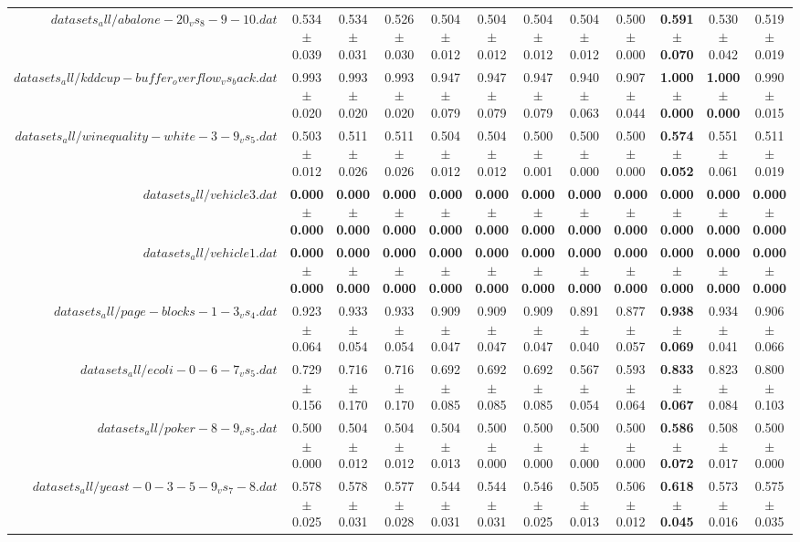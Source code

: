 \begin{table}[!ht]
{\begin{tabular}{r c c c c c c c c c c c}
$datasets_all/abalone-20_vs_8-9-10.dat$ & 0.534 $\pm$ 0.039 & 0.534 $\pm$ 0.031 & 0.526 $\pm$ 0.030 & 0.504 $\pm$ 0.012 & 0.504 $\pm$ 0.012 & 0.504 $\pm$ 0.012 & 0.504 $\pm$ 0.012 & 0.500 $\pm$ 0.000 & \textbf{0.591 $\pm$ 0.070} & 0.530 $\pm$ 0.042 & 0.519 $\pm$ 0.019 \\
$datasets_all/kddcup-buffer_overflow_vs_back.dat$ & 0.993 $\pm$ 0.020 & 0.993 $\pm$ 0.020 & 0.993 $\pm$ 0.020 & 0.947 $\pm$ 0.079 & 0.947 $\pm$ 0.079 & 0.947 $\pm$ 0.079 & 0.940 $\pm$ 0.063 & 0.907 $\pm$ 0.044 & \textbf{1.000 $\pm$ 0.000} & \textbf{1.000 $\pm$ 0.000} & 0.990 $\pm$ 0.015 \\
$datasets_all/winequality-white-3-9_vs_5.dat$ & 0.503 $\pm$ 0.012 & 0.511 $\pm$ 0.026 & 0.511 $\pm$ 0.026 & 0.504 $\pm$ 0.012 & 0.504 $\pm$ 0.012 & 0.500 $\pm$ 0.001 & 0.500 $\pm$ 0.000 & 0.500 $\pm$ 0.000 & \textbf{0.574 $\pm$ 0.052} & 0.551 $\pm$ 0.061 & 0.511 $\pm$ 0.019 \\
$datasets_all/vehicle3.dat$ & \textbf{0.000 $\pm$ 0.000} & \textbf{0.000 $\pm$ 0.000} & \textbf{0.000 $\pm$ 0.000} & \textbf{0.000 $\pm$ 0.000} & \textbf{0.000 $\pm$ 0.000} & \textbf{0.000 $\pm$ 0.000} & \textbf{0.000 $\pm$ 0.000} & \textbf{0.000 $\pm$ 0.000} & \textbf{0.000 $\pm$ 0.000} & \textbf{0.000 $\pm$ 0.000} & \textbf{0.000 $\pm$ 0.000} \\
$datasets_all/vehicle1.dat$ & \textbf{0.000 $\pm$ 0.000} & \textbf{0.000 $\pm$ 0.000} & \textbf{0.000 $\pm$ 0.000} & \textbf{0.000 $\pm$ 0.000} & \textbf{0.000 $\pm$ 0.000} & \textbf{0.000 $\pm$ 0.000} & \textbf{0.000 $\pm$ 0.000} & \textbf{0.000 $\pm$ 0.000} & \textbf{0.000 $\pm$ 0.000} & \textbf{0.000 $\pm$ 0.000} & \textbf{0.000 $\pm$ 0.000} \\
$datasets_all/page-blocks-1-3_vs_4.dat$ & 0.923 $\pm$ 0.064 & 0.933 $\pm$ 0.054 & 0.933 $\pm$ 0.054 & 0.909 $\pm$ 0.047 & 0.909 $\pm$ 0.047 & 0.909 $\pm$ 0.047 & 0.891 $\pm$ 0.040 & 0.877 $\pm$ 0.057 & \textbf{0.938 $\pm$ 0.069} & 0.934 $\pm$ 0.041 & 0.906 $\pm$ 0.066 \\
$datasets_all/ecoli-0-6-7_vs_5.dat$ & 0.729 $\pm$ 0.156 & 0.716 $\pm$ 0.170 & 0.716 $\pm$ 0.170 & 0.692 $\pm$ 0.085 & 0.692 $\pm$ 0.085 & 0.692 $\pm$ 0.085 & 0.567 $\pm$ 0.054 & 0.593 $\pm$ 0.064 & \textbf{0.833 $\pm$ 0.067} & 0.823 $\pm$ 0.084 & 0.800 $\pm$ 0.103 \\
$datasets_all/poker-8-9_vs_5.dat$ & 0.500 $\pm$ 0.000 & 0.504 $\pm$ 0.012 & 0.504 $\pm$ 0.012 & 0.504 $\pm$ 0.013 & 0.500 $\pm$ 0.000 & 0.500 $\pm$ 0.000 & 0.500 $\pm$ 0.000 & 0.500 $\pm$ 0.000 & \textbf{0.586 $\pm$ 0.072} & 0.508 $\pm$ 0.017 & 0.500 $\pm$ 0.000 \\
$datasets_all/yeast-0-3-5-9_vs_7-8.dat$ & 0.578 $\pm$ 0.025 & 0.578 $\pm$ 0.031 & 0.577 $\pm$ 0.028 & 0.544 $\pm$ 0.031 & 0.544 $\pm$ 0.031 & 0.546 $\pm$ 0.025 & 0.505 $\pm$ 0.013 & 0.506 $\pm$ 0.012 & \textbf{0.618 $\pm$ 0.045} & 0.573 $\pm$ 0.016 & 0.575 $\pm$ 0.035 \\
\end{tabular}}
\end{table}

